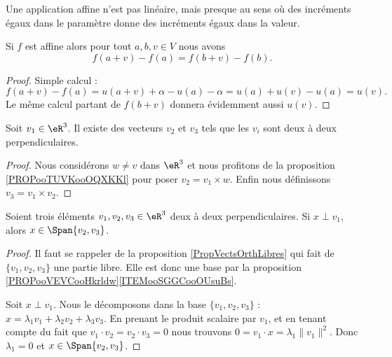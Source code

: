 Une application affine n'est pas linéaire, mais presque au sens où des incréments égaux dans le paramètre donne des incréments égaux dans la valeur.
\begin{lemma}       \label{LEMooEQEAooQaFCMW}
	Si \( f\) est affine alors pour tout \( a,b,v\in V\) nous avons
	\begin{equation}
		f(a+v)-f(a)=f(b+v)-f(b).
	\end{equation}
\end{lemma}

\begin{proof}
	Simple calcul :
	\begin{equation}
		f(a+v)-f(a)=u(a+v)+\alpha-u(a)-\alpha=u(a)+u(v)-u(a)=u(v).
	\end{equation}
	Le même calcul partant de \( f(b+v)\) donnera évidemment aussi \( u(v)\).
\end{proof}

\begin{lemma}       \label{LEMooGUVMooPXtXnV}
	Soit \( v_1\in \eR^3\). Il existe des vecteurs \( v_2\) et \( v_3\) tels que les \( v_i\) sont deux à deux perpendiculaires.
\end{lemma}

\begin{proof}
	Nous considérons \( w\neq v\) dans \( \eR^3\) et nous profitons de la proposition \ref{PROPooTUVKooOQXKKl} pour poser \( v_2=v_1\times w\). Enfin nous définissons \( v_3=v_1\times v_2\).
\end{proof}

\begin{lemma}       \label{LEMooGXGCooDfgbqG}
	Soient trois éléments \( v_1,v_2,v_3\in \eR^3\) deux à deux perpendiculaires. Si \( x\perp v_1\), alors \( x\in \Span\{ v_2,v_3 \}\).
\end{lemma}

\begin{proof}
	Il faut se rappeler de la proposition \ref{PropVectsOrthLibres} qui fait de \( \{ v_1,v_2,v_3 \}\) une partie libre. Elle est donc une base par la proposition \ref{PROPooVEVCooHkrldw}\ref{ITEMooSGGCooOUsuBs}.

	Soit \( x\perp v_1\). Nous le décomposons dans la base \( \{ v_1,v_2,v_3 \}\) : \( x=\lambda_1 v_1+\lambda_2 v_2+\lambda_3v_3\). En prenant le produit scalaire par \( v_1\), et en tenant compte du fait que \( v_1\cdot v_2=v_2\cdot v_3=0\) nous trouvons \( 0=v_1\cdot x=\lambda_1\| v_1 \|^2\). Donc \( \lambda_1=0\) et \( x\in \Span\{ v_2,v_3 \}\).
\end{proof}

